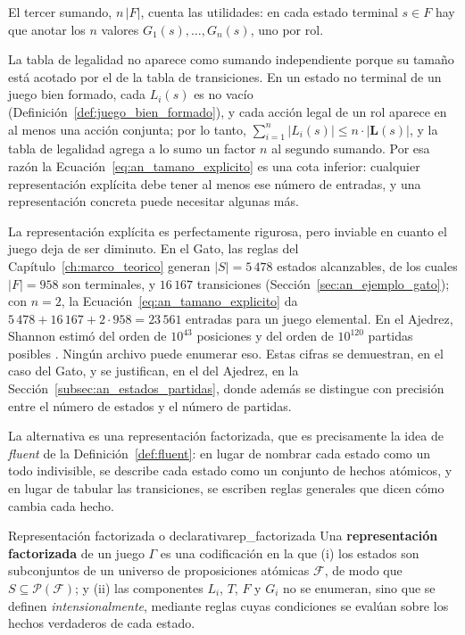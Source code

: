 El tercer sumando, $n\,|F|$, cuenta las utilidades: en cada estado terminal $s \in F$ hay que anotar los $n$ valores $G_1(s), \dots, G_n(s)$, uno por rol.

La tabla de legalidad no aparece como sumando independiente porque su tamaño está acotado por el de la tabla de transiciones. En un estado no terminal de un juego bien formado, cada $L_i(s)$ es no vacío (Definición~\ref{def:juego_bien_formado}), y cada acción legal de un rol aparece en al menos una acción conjunta; por lo tanto, $\sum_{i=1}^n |L_i(s)| \le n \cdot |\mathbf L(s)|$, y la tabla de legalidad agrega a lo sumo un factor $n$ al segundo sumando. Por esa razón la Ecuación~\eqref{eq:an_tamano_explicito} es una cota inferior: cualquier representación explícita debe tener al menos ese número de entradas, y una representación concreta puede necesitar algunas más.

La representación explícita es perfectamente rigurosa, pero inviable en cuanto el juego deja de ser diminuto. En el Gato, las reglas del Capítulo~\ref{ch:marco_teorico} generan $|S| = 5\,478$ estados alcanzables, de los cuales $|F| = 958$ son terminales, y $16\,167$ transiciones (Sección~\ref{sec:an_ejemplo_gato}); con $n = 2$, la Ecuación~\eqref{eq:an_tamano_explicito} da $5\,478 + 16\,167 + 2 \cdot 958 = 23\,561$ entradas para un juego elemental. En el Ajedrez, Shannon estimó del orden de $10^{43}$ posiciones y del orden de $10^{120}$ partidas posibles \cite{Shannon1950}. Ningún archivo puede enumerar eso. Estas cifras se demuestran, en el caso del Gato, y se justifican, en el del Ajedrez, en la Sección~\ref{subsec:an_estados_partidas}, donde además se distingue con precisión entre el número de estados y el número de partidas.

La alternativa es una representación factorizada, que es precisamente la idea de \textit{fluent} de la Definición~\ref{def:fluent}: en lugar de nombrar cada estado como un todo indivisible, se describe cada estado como un conjunto de hechos atómicos, y en lugar de tabular las transiciones, se escriben reglas generales que dicen cómo cambia cada hecho.

\begin{definicion}{Representación factorizada o declarativa}{rep_factorizada}
Una \textbf{representación factorizada} de un juego $\Gamma$ es una codificación en la que (i) los estados son subconjuntos de un universo de proposiciones atómicas $\mathcal F$, de modo que $S \subseteq \mathcal P(\mathcal F)$; y (ii) las componentes $L_i$, $T$, $F$ y $G_i$ no se enumeran, sino que se definen \emph{intensionalmente}, mediante reglas cuyas condiciones se evalúan sobre los hechos verdaderos de cada estado.
\end{definicion}

